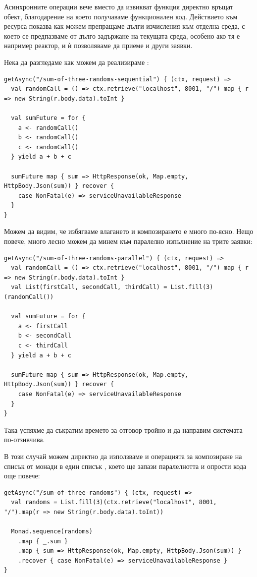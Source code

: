 Асинхронните операции вече вместо да извикват  функция директно връщат  обект, благодарение на което получаваме функционален код. Действието към ресурса  показва как можем препращаме дълги изчисления към отделна среда, с което се предпазваме от дълго задържане на текущата среда, особено ако тя е например реактор, и ѝ позволяваме да приеме и други заявки.

Нека да разгледаме как можем да реализираме :

\begin{lstlisting}
getAsync("/sum-of-three-randoms-sequential") { (ctx, request) =>
  val randomCall = () => ctx.retrieve("localhost", 8001, "/") map { r => new String(r.body.data).toInt }
  
  val sumFuture = for {
    a <- randomCall()
    b <- randomCall()
    c <- randomCall()
  } yield a + b + c
  
  sumFuture map { sum => HttpResponse(ok, Map.empty, HttpBody.Json(sum)) } recover {
    case NonFatal(e) => serviceUnavailableResponse
  }
}
\end{lstlisting}

Можем да видим, че избягваме влагането и композирането е много по-ясно. Нещо повече, много лесно можем да минем към паралелно изпълнение на трите заявки:

\begin{lstlisting}
getAsync("/sum-of-three-randoms-parallel") { (ctx, request) =>
  val randomCall = () => ctx.retrieve("localhost", 8001, "/") map { r => new String(r.body.data).toInt }
  val List(firstCall, secondCall, thirdCall) = List.fill(3)(randomCall())
  
  val sumFuture = for {
    a <- firstCall
    b <- secondCall
    c <- thirdCall
  } yield a + b + c
    
  sumFuture map { sum => HttpResponse(ok, Map.empty, HttpBody.Json(sum)) } recover {
    case NonFatal(e) => serviceUnavailableResponse
  }
}
\end{lstlisting}

Така успяхме да съкратим времето за отговор тройно и да направим системата по-отзивчива.

В този случай можем директно да използваме и операцията за композиране на списък от монади в един списък , което ще запази паралелнотта и опрости кода още повече:

\begin{lstlisting}
getAsync("/sum-of-three-randoms") { (ctx, request) =>
  val randoms = List.fill(3)(ctx.retrieve("localhost", 8001, "/").map(r => new String(r.body.data).toInt))
  
  Monad.sequence(randoms)
    .map { _.sum }
    .map { sum => HttpResponse(ok, Map.empty, HttpBody.Json(sum)) }
    .recover { case NonFatal(e) => serviceUnavailableResponse }
}
\end{lstlisting}

